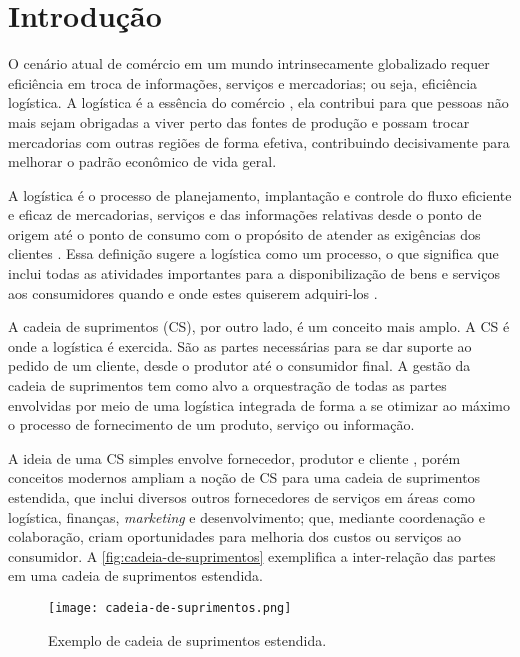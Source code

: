 \chapter{Introdução}

	O cenário atual de comércio em um mundo intrinsecamente globalizado requer eficiência em troca de informações, serviços e mercadorias; ou seja, eficiência logística. A logística é a essência do comércio \cite{ballou2006cadeiasuprimentos}, ela contribui para que pessoas não mais sejam obrigadas a viver perto das fontes de produção e possam trocar mercadorias com outras regiões de forma efetiva, contribuindo decisivamente para melhorar o padrão econômico de vida geral. 
	
	A logística é o processo de planejamento, implantação e controle do fluxo eficiente e eficaz de mercadorias, serviços e das informações relativas desde o ponto de origem até o ponto de consumo com o propósito de atender as exigências dos clientes \cite{cscmp2013supplychainglossary}. Essa definição sugere a logística como um processo, o que significa que inclui todas as atividades importantes para a disponibilização de bens e serviços aos consumidores quando e onde estes quiserem adquiri-los \cite{ballou2006cadeiasuprimentos}.
	
	A cadeia de suprimentos (CS), por outro lado, é um conceito mais amplo. A CS é onde a logística é exercida. São as partes necessárias para se dar suporte ao pedido de um cliente, desde o produtor até o consumidor final. A gestão da cadeia de suprimentos tem como alvo a orquestração de todas as partes envolvidas por meio de uma logística integrada de forma a se otimizar ao máximo o processo de fornecimento de um produto, serviço ou informação.
	
	A ideia de uma CS simples envolve fornecedor, produtor e cliente \cite{hugos2018supplychain}, porém conceitos modernos ampliam a noção de CS para uma cadeia de suprimentos estendida, que inclui diversos outros fornecedores de serviços em áreas como logística, finanças, \textit{marketing} e desenvolvimento; que, mediante coordenação e colaboração, criam oportunidades para melhoria dos custos ou serviços ao consumidor. A \autoref{fig:cadeia-de-suprimentos} exemplifica a inter-relação das partes em uma cadeia de suprimentos estendida.
		
	\begin{figure}[htb]
		\centering
		\label{fig:cadeia-de-suprimentos}
		\caption{Exemplo de cadeia de suprimentos estendida.}
		\texttt{[image: cadeia-de-suprimentos.png]}
	\end{figure}
	
